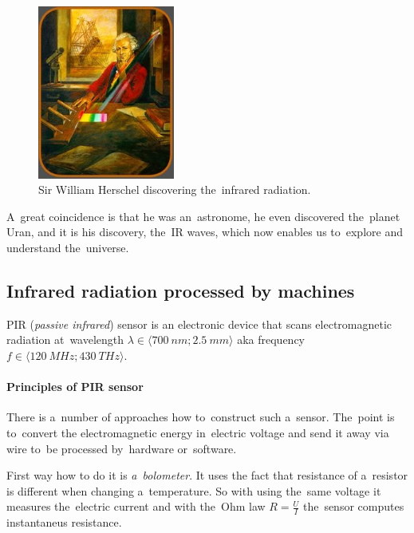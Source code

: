 \begin{figure}[h!]
\begin{center}
\includegraphics[width=0.4\textwidth]{obrazky-figures/herschel.jpg}
\caption{Sir William Herschel discovering the~infrared radiation.\cite{HerschelLife}\label{fig:herschel}}
\end{center}    
\end{figure}

A~great coincidence is that he was an~astronome, he even discovered the~planet Uran, and it is his discovery,
the~IR waves, which now enables us to~explore and understand the~universe. \cite{NasaIrVideo}



\subsection*{Infrared radiation processed by machines}
\label{IRsensing}
PIR ({\it passive infrared}) sensor is an electronic device that scans electromagnetic
radiation at~wavelength $\lambda\in \langle 700~nm;2.5~mm \rangle$ aka frequency $f\in \langle 120~MHz;430~THz \rangle$. \cite{an2105}

\paragraph{Principles of PIR sensor}
There is a~number of approaches how to~construct such a~sensor. The~point is to~convert the electromagnetic
energy in~electric voltage and send it away via wire to~be processed by~hardware or~software.

First way how to do it is {\it a~bolometer}. It uses the fact that resistance of a~resistor is different
when changing a~temperature. So with using the~same voltage it measures the~electric current and
with the~Ohm law $R = \frac{U}{I}$ the~sensor computes instantaneus resistance.

